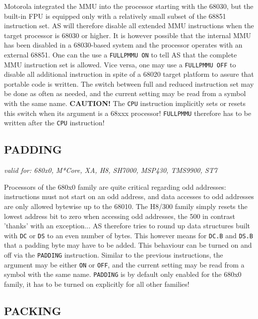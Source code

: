 \documentclass[12pt,twoside]{report}
\makeatletter
\newcommand{\bb}[1]{{\bf #1}}
\newcommand{\tty}[1]{{\tt #1}}
\newcommand{\ttindex}[1]{\index{#1@{\tt #1}}}
\makeatother
\begin{document}
Motorola integrated the MMU into the processor starting with the 68030, but
the built-in FPU is equipped only with a relatively small subset of the
68851 instruction set.  AS will therefore disable all extended MMU
instructions when the target processor is 68030 or higher.  It is however
possible that the internal MMU has been disabled in a 68030-based system
and the processor operates with an external 68851.  One can the use a
\tty{FULLPMMU ON} to tell AS that the complete MMU instruction set is
allowed.  Vice versa, one may use a \tty{FULLPMMU OFF} to disable all
additional instruction in spite of a 68020 target platform to assure that
portable code is written.  The switch between full and reduced instruction
set may be done as often as needed, and the current setting may be read
from a symbol with the same name.  \bb{CAUTION!} The \tty{CPU} instruction
implicitly sets or resets this switch when its argument is a 68xxx
processor!  \tty{FULLPMMU} therefore has to be written after the \tty{CPU}
instruction!


\subsection{PADDING}
\ttindex{PADDING}

{\em valid for: 680x0, M*Core, XA, H8, SH7000, MSP430, TMS9900, ST7}

Processors of the 680x0 family are quite critical regarding odd addresses:
instructions must not start on an odd address, and data accesses to odd
addresses are only allowed bytewise up to the 68010.  The H8/300 family
simply resets the lowest address bit to zero when accessing odd addresses,
the 500 in contrast 'thanks' with an exception...  AS therefore tries to
round up data structures built with \tty{DC} or \tty{DS} to an even number
of bytes.  This however means for \tty{DC.B} and \tty{DS.B} that a padding
byte may have to be added.  This behaviour can be turned on and off via
the \tty{PADDING} instruction.  Similar to the previous instructions, the
argument may be either \tty{ON} or \tty{OFF}, and the current setting may
be read from a symbol with the same name.  \tty{PADDING} is by default only
enabled for the 680x0 family, it has to be turned on explicitly for all
other families!


\subsection{PACKING}
\ttindex{PACKING}
\end{document}
